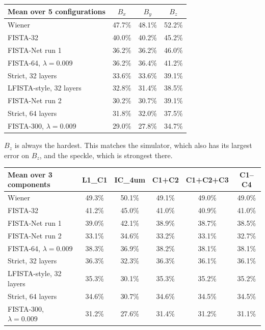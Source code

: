 \begin{center}
\begin{tabular}{lccc}
\toprule
Mean over 5 configurations & $B_x$ & $B_y$ & $B_z$ \\
\midrule
Wiener & 47.7\% & 48.1\% & 52.2\% \\
FISTA-32 & 40.0\% & 40.2\% & 45.2\% \\
FISTA-Net run 1 & 36.2\% & 36.2\% & 46.0\% \\
FISTA-64, $\lambda=0.009$ & 36.2\% & 36.4\% & 41.2\% \\
Strict, 32 layers & 33.6\% & 33.6\% & 39.1\% \\
LFISTA-style, 32 layers & 32.8\% & 31.4\% & 38.5\% \\
FISTA-Net run 2 & 30.2\% & 30.7\% & 39.1\% \\
Strict, 64 layers & 31.8\% & 32.0\% & 37.5\% \\
FISTA-300, $\lambda=0.009$ & 29.0\% & 27.8\% & 34.7\% \\
\bottomrule
\end{tabular}
\end{center}

$B_z$ is always the hardest. This matches the simulator, which also has its largest error on $B_z$, and the speckle,
which is strongest there.

\begin{center}
\begin{tabular}{lccccc}
\toprule
Mean over 3 components & L1\_C1 & IC\_4um & C1+C2 & C1+C2+C3 & C1--C4 \\
\midrule
Wiener & 49.3\% & 50.1\% & 49.1\% & 49.0\% & 49.0\% \\
FISTA-32 & 41.2\% & 45.0\% & 41.0\% & 40.9\% & 41.0\% \\
FISTA-Net run 1 & 39.0\% & 42.1\% & 38.9\% & 38.7\% & 38.5\% \\
FISTA-Net run 2 & 33.1\% & 34.6\% & 33.2\% & 33.1\% & 32.7\% \\
FISTA-64, $\lambda=0.009$ & 38.3\% & 36.9\% & 38.2\% & 38.1\% & 38.1\% \\
Strict, 32 layers & 36.3\% & 32.3\% & 36.3\% & 36.1\% & 36.1\% \\
LFISTA-style, 32 layers & 35.3\% & 30.1\% & 35.3\% & 35.2\% & 35.2\% \\
Strict, 64 layers & 34.6\% & 30.7\% & 34.6\% & 34.5\% & 34.5\% \\
FISTA-300, $\lambda=0.009$ & 31.2\% & 27.6\% & 31.4\% & 31.2\% & 31.1\% \\
\bottomrule
\end{tabular}
\end{center}

